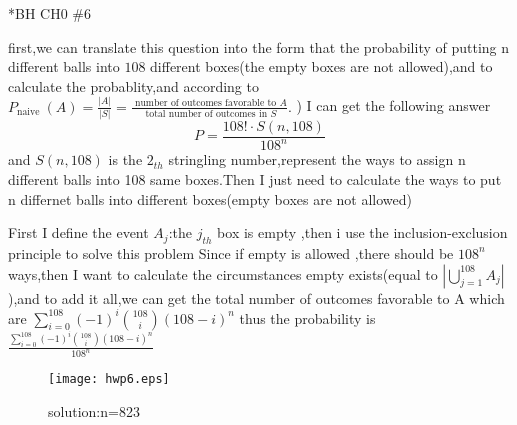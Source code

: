 \documentclass{article}
\begin{document}
\begin{homeworkProblem}*{BH CH0 \#6}

first,we can translate this question into the form that the probability of putting n different balls into $108$ different boxes(the empty boxes are not allowed),and to calculate the probablity,and according to $P_{\text {naive }}(A)=\frac{|A|}{|S|}=\frac{\text { number of outcomes favorable to } A}{\text { total number of outcomes in } S} \text {. }$)
I can get the following answer 
$$
P=\frac{108!\cdot S(n,108)}{108^n}
$$
and $S(n,108)$ is the $2_{th}$ stringling number,represent the ways to assign n different balls into 108 same boxes.Then I just need to calculate the ways to put n differnet balls into different boxes(empty boxes are not allowed)

First I define the event $A_j$:the $j_{th}$ box is empty ,then i use the inclusion-exclusion principle to solve this problem
Since if empty is allowed ,there should be $108^n$ ways,then I want to calculate the circumstances empty exists(equal to $|\bigcup_{j=1}^{108} A_j|$),and to add it all,we can get the total number of outcomes favorable to A which are $\sum_{i=0}^{108}(-1)^i\binom{108}{i}(108-i)^n$
thus the probability is $\frac{\sum_{i=0}^{108}(-1)^i\binom{108}{i}(108-i)^n}{108^n}$
\begin{figure}[htbp]
	\centering
	\texttt{[image: hwp6.eps]}
	\caption{solution:n=823}

\end{figure}
\end{homeworkProblem}
\end{document}
